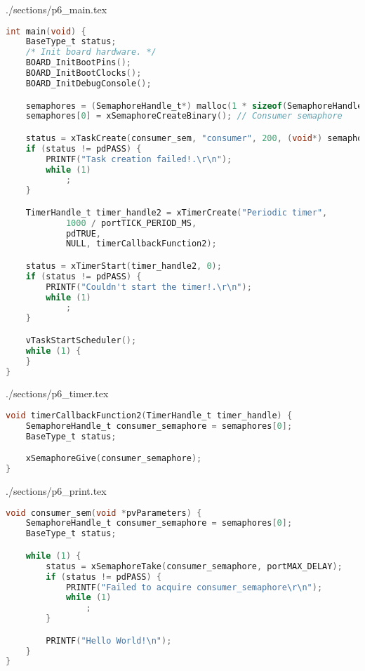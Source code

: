 \begin{filecontents}[overwrite]{./sections/p6_main.tex}
\begin{lstlisting}[language=c,caption=Problem 6 Producer Task, label=list:p6_main]
int main(void) {
    BaseType_t status;
    /* Init board hardware. */
    BOARD_InitBootPins();
    BOARD_InitBootClocks();
    BOARD_InitDebugConsole();

    semaphores = (SemaphoreHandle_t*) malloc(1 * sizeof(SemaphoreHandle_t));
    semaphores[0] = xSemaphoreCreateBinary(); // Consumer semaphore

    status = xTaskCreate(consumer_sem, "consumer", 200, (void*) semaphores, 2, NULL);
    if (status != pdPASS) {
        PRINTF("Task creation failed!.\r\n");
        while (1)
            ;
    }

    TimerHandle_t timer_handle2 = xTimerCreate("Periodic timer",
            1000 / portTICK_PERIOD_MS,
            pdTRUE,
            NULL, timerCallbackFunction2);

    status = xTimerStart(timer_handle2, 0);
    if (status != pdPASS) {
        PRINTF("Couldn't start the timer!.\r\n");
        while (1)
            ;
    }

    vTaskStartScheduler();
    while (1) {
    }
}
\end{lstlisting}
\end{filecontents}

\begin{filecontents}[overwrite]{./sections/p6_timer.tex}
\begin{lstlisting}[language=c,caption=Problem 6 Periodic Timer Callback Function, label=list:p6_timer]
void timerCallbackFunction2(TimerHandle_t timer_handle) {
    SemaphoreHandle_t consumer_semaphore = semaphores[0];
    BaseType_t status;

    xSemaphoreGive(consumer_semaphore);
}
\end{lstlisting}
\end{filecontents}

\begin{filecontents}[overwrite]{./sections/p6_print.tex}
\begin{lstlisting}[language=c,caption=Problem 6 Print Task, label=list:p6_print]
void consumer_sem(void *pvParameters) {
    SemaphoreHandle_t consumer_semaphore = semaphores[0];
    BaseType_t status;

    while (1) {
        status = xSemaphoreTake(consumer_semaphore, portMAX_DELAY);
        if (status != pdPASS) {
            PRINTF("Failed to acquire consumer_semaphore\r\n");
            while (1)
                ;
        }

        PRINTF("Hello World!\n");
    }
}
\end{lstlisting}
\end{filecontents}

